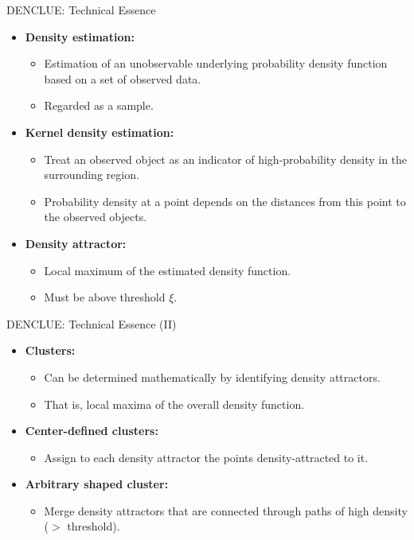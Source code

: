 \begin{frame}{DENCLUE: Technical Essence}
	\begin{itemize}
		\item \textbf{Density estimation:}
		\begin{itemize}
			\item Estimation of an unobservable underlying probability density 
			function based on a set of observed data.
			\item Regarded as a sample.
		\end{itemize}
		\item \textbf{Kernel density estimation:}
		\begin{itemize}
			\item Treat an observed object as an indicator of high-probability 
			density in the surrounding region.
			\item Probability density at a point depends on the distances from 
			this point to the observed objects.
		\end{itemize}
		\item \textbf{Density attractor:}
		\begin{itemize}
			\item Local maximum of the estimated density function.
			\item Must be above threshold $\xi$.
		\end{itemize}
	\end{itemize}
\end{frame}

\begin{frame}{DENCLUE: Technical Essence (II)}
	\begin{itemize}
		\item \textbf{Clusters:}
		\begin{itemize}
			\item Can be determined mathematically by identifying density 
			attractors.
			\item That is, local maxima of the overall density function.
		\end{itemize}
		\item \textbf{Center-defined clusters:}
		\begin{itemize}
			\item Assign to each density attractor the points density-attracted 
			to it.
		\end{itemize}
		\item \textbf{Arbitrary shaped cluster:}
		\begin{itemize}
			\item Merge density attractors that are connected through paths of 
			high density ($>$ threshold).
		\end{itemize}
	\end{itemize}
\end{frame}

